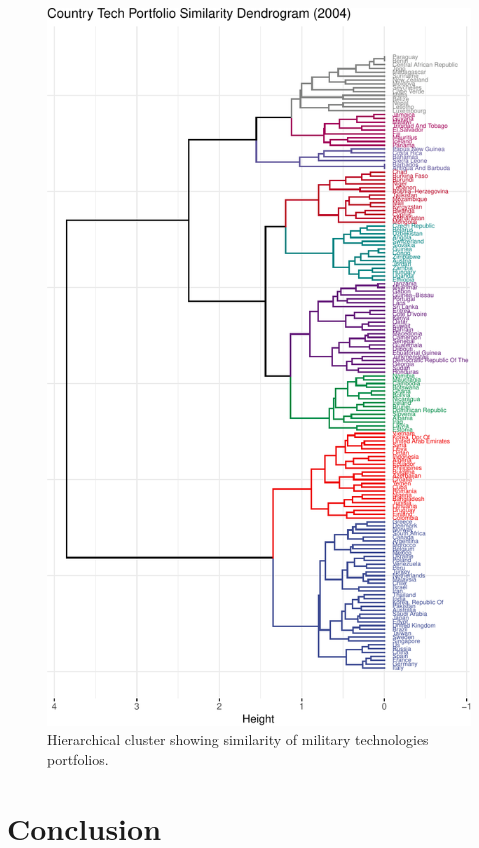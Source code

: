 \documentclass[
]{article}
\begin{document}
\begin{figure}[H]

{\centering \includegraphics{2021-09-24_rDMC_files/figure-latex/country-clusters-1} 

}

\caption{Hierarchical cluster showing similarity of military technologies portfolios.}\label{fig:country-clusters}
\end{figure}

\hypertarget{conclusion}{%
\section{Conclusion}\label{conclusion}}
\end{document}
